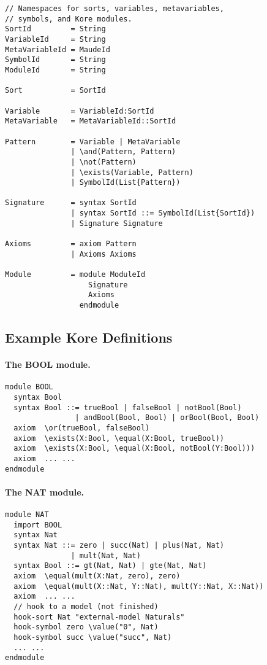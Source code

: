 \documentclass[UTF8]{article}
\theoremstyle{plain}
\theoremstyle{definition}
\theoremstyle{remark}
\begin{document}
\begin{Verbatim}[fontsize=\small]
// Namespaces for sorts, variables, metavariables,
// symbols, and Kore modules.
SortId         = String
VariableId     = String
MetaVariableId = MaudeId
SymbolId       = String
ModuleId       = String

Sort           = SortId

Variable       = VariableId:SortId
MetaVariable   = MetaVariableId::SortId

Pattern        = Variable | MetaVariable
               | \and(Pattern, Pattern)
               | \not(Pattern)
               | \exists(Variable, Pattern)
               | SymbolId(List{Pattern})

Signature      = syntax SortId
               | syntax SortId ::= SymbolId(List{SortId})
               | Signature Signature

Axioms         = axiom Pattern
               | Axioms Axioms

Module         = module ModuleId
                   Signature
                   Axioms
                 endmodule
\end{Verbatim}

\subsection{Example Kore Definitions}

\paragraph{The {\small BOOL} module.}\quad
\begin{Verbatim}
module BOOL
  syntax Bool
  syntax Bool ::= trueBool | falseBool | notBool(Bool)
                | andBool(Bool, Bool) | orBool(Bool, Bool)
  axiom  \or(trueBool, falseBool)
  axiom  \exists(X:Bool, \equal(X:Bool, trueBool))
  axiom  \exists(X:Bool, \equal(X:Bool, notBool(Y:Bool)))
  axiom  ... ...
endmodule
\end{Verbatim}

\paragraph{The {\small NAT} module.}\quad  
\begin{Verbatim}
module NAT
  import BOOL
  syntax Nat
  syntax Nat ::= zero | succ(Nat) | plus(Nat, Nat) 
               | mult(Nat, Nat)
  syntax Bool ::= gt(Nat, Nat) | gte(Nat, Nat)
  axiom  \equal(mult(X:Nat, zero), zero)
  axiom  \equal(mult(X::Nat, Y::Nat), mult(Y::Nat, X::Nat))
  axiom  ... ...
  // hook to a model (not finished)
  hook-sort Nat "external-model Naturals"
  hook-symbol zero \value("0", Nat)
  hook-symbol succ \value("succ", Nat)
  ... ...
endmodule
\end{Verbatim}
\end{document}
